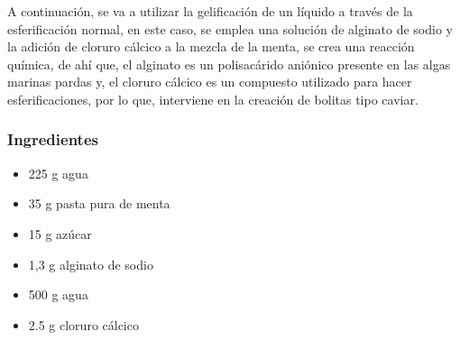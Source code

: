 \documentclass{scrartcl}
\begin{document}
	A continuación, se va a utilizar la gelificación de un líquido a través de la esferificación normal, en este caso, se emplea una solución de alginato de sodio y la adición de cloruro cálcico a la mezcla de la menta, se crea una reacción química, de ahí que, el alginato es un polisacárido aniónico presente en las algas marinas pardas y, el cloruro cálcico es un compuesto utilizado para hacer esferificaciones, por lo que, interviene en la creación de bolitas tipo caviar.
	
	\subsubsection{Ingredientes}
		\begin{multicols}{2}
			\begin{itemize}
				\item 225 g agua 
				\item 35 g pasta pura de menta 
				\item 15 g azúcar 
				\item 1,3 g alginato de sodio
				\item 500 g agua 
				\item 2.5 g cloruro cálcico 
			\end{itemize}
		\end{multicols}
	
\end{document}
